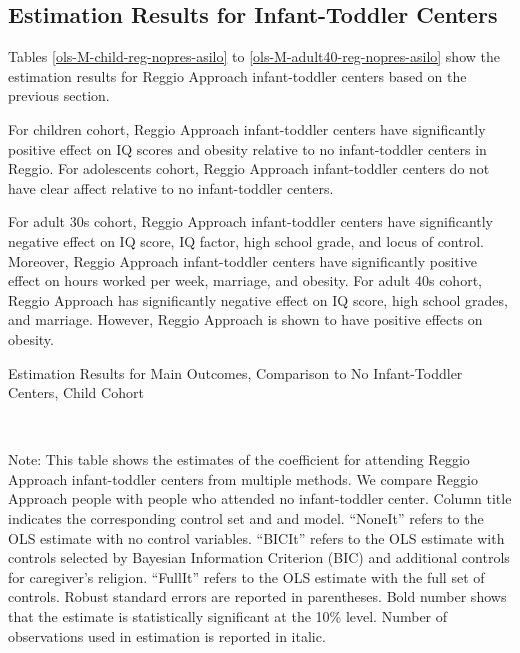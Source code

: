 

\subsection{Estimation Results for Infant-Toddler Centers}


Tables \ref{ols-M-child-reg-nopres-asilo} to \ref{ols-M-adult40-reg-nopres-asilo} show the estimation results for Reggio Approach infant-toddler centers based on the previous section. 

For children cohort, Reggio Approach infant-toddler centers have significantly positive effect on IQ scores and obesity relative to no infant-toddler centers in Reggio. For adolescents cohort, Reggio Approach infant-toddler centers do not have clear affect relative to no infant-toddler centers. 

For adult 30s cohort, Reggio Approach infant-toddler centers have significantly negative effect on IQ score, IQ factor, high school grade, and locus of control. Moreover, Reggio Approach infant-toddler centers have significantly positive effect on hours worked per week, marriage, and obesity. For adult 40s cohort, Reggio Approach has significantly negative effect on IQ score, high school grades, and marriage. However, Reggio Approach is shown to have positive effects on obesity. 


\begin{table}[H] \caption{Estimation Results for Main Outcomes, Comparison to No Infant-Toddler Centers, Child Cohort} \label{ols-M-child-reg-nopres-asilo}
\scalebox{0.8}{}
\vspace{1ex} \\
\footnotesize\raggedright{Note: This table shows the estimates of the coefficient for attending Reggio Approach infant-toddler centers from multiple methods. We compare Reggio Approach people with people who attended no infant-toddler center. Column title indicates the corresponding control set and and model. ``NoneIt'' refers to the OLS estimate with no control variables. ``BICIt'' refers to the OLS estimate with controls selected by Bayesian Information Criterion (BIC) and additional controls for caregiver's religion. ``FullIt'' refers to the OLS estimate with the full set of controls. Robust standard errors are reported in parentheses. Bold number shows that the estimate is statistically significant at the 10\% level. Number of observations used in estimation is reported in italic.}

\end{table}

